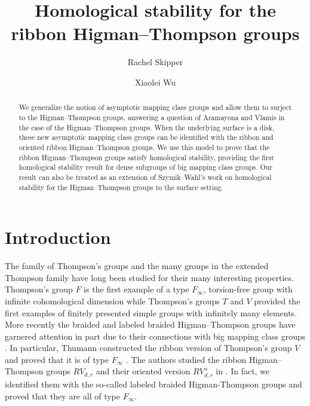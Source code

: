 \documentclass[11pt, a4paper]{amsart}
\title{Homological stability for the ribbon Higman--Thompson groups}
\author{Rachel Skipper}
\author{Xiaolei Wu}
\theoremstyle{definition}
\begin{document}
\begin{abstract}
We generalize the notion of asymptotic mapping class groups and allow them to surject to the Higman--Thompson groups, answering a question of Aramayona and Vlamis in the case of the Higman--Thompson groups. When the underlying surface is a disk, these new  asymptotic mapping class groups can be identified with the ribbon and oriented ribbon Higman--Thompson groups. We use this model to prove that the ribbon Higman--Thompson groups satisfy homological stability, providing the first homological stability result for dense subgroups of big mapping class groups. Our result can also be treated as an extension of Szymik--Wahl's work on homological stability for the Higman--Thompson groups  to the surface setting.
\end{abstract}

\maketitle




\section*{Introduction}



The family of Thompson's groups and the many groups in the extended Thompson family have long been studied for their many interesting properties. Thompson's group $F$ is the first example of a type $F_\infty$, torsion-free group with infinite cohomological dimension \cite{BG84} while Thompson's groups $T$ and $V$ provided the first examples of finitely presented simple groups with infinitely many elements. More recently the braided and labeled braided Higman--Thompson groups have garnered attention in part due to their connections with big mapping class groups \cite{Br06,Deh06,AC20,SW21}.  In particular,  Thumann constructed the ribbon version of Thompson's group $V$ and proved that it is of type $F_\infty$ \cite{Th17}. The authors studied the ribbon Higman--Thompson groups $RV_{d,r}$ and their oriented version $RV_{d,r}^+$ in \cite{SW21}. In fact, we identified them with the so-called labeled braided Higman-Thompson groups and proved that they are all of type $F_\infty$.
\end{document}
